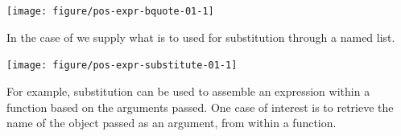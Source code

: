 \documentclass[krantz2]{krantz}\usepackage{knitr}%
\begin{document}
\begin{knitrout}\footnotesize
{}\color{fgcolor}\begin{kframe}
\begin{alltt}
  \hlopt{+}
  \hlstd{()} \hlopt{+}
  \hlstd{(} \hlstd{=} \hlopt{~}\hlopt{:} \hlstd{(}\hlstd{())),}
        \hlstd{=} \hlopt{:} \hlstd{(}\hlstd{(}\hlstd{())))}
       \hlstd{)}
\end{alltt}
\end{kframe}

{\centering \texttt{[image: figure/pos-expr-bquote-01-1]} 

}



\end{knitrout}

In the case of  we supply what is to used for substitution through a named list.

\begin{knitrout}\footnotesize
{}\color{fgcolor}\begin{kframe}
\begin{alltt}
  \hlopt{+}
  \hlstd{()} \hlopt{+}
  \hlstd{(} \hlstd{=} \hlopt{~}\hlopt{:}  \hlstd{(} \hlstd{=} \hlstd{())),}
        \hlstd{=} \hlopt{:}  \hlstd{(} \hlstd{=} \hlstd{(}\hlstd{())))}
       \hlstd{)}
\end{alltt}
\end{kframe}

{\centering \texttt{[image: figure/pos-expr-substitute-01-1]} 

}



\end{knitrout}

For example, substitution can be used to assemble an expression within a function based on the arguments passed. One case of interest is to retrieve the name of the object passed as an argument, from within a function.
\end{document}
